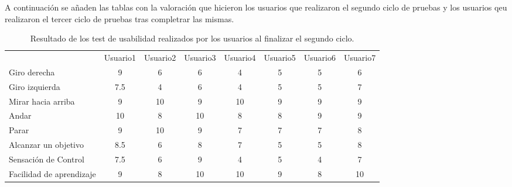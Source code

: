 \documentclass[twoside, 11pt]{epstfg}
\begin{document}
A continuación se añaden las tablas con la valoración que hicieron los usuarios que realizaron el segundo ciclo de pruebas y los usuarios qeu realizaron el tercer ciclo de pruebas tras completrar las mismas. 



\begin{center}
	\begin{table}[h]
		\small
		
		\begin{tabular}{|g  c  c  c  c  c  c  c |}
			\hline
			 \\ \hline
			& Usuario1 & Usuario2 & Usuario3 & Usuario4 & Usuario5 & Usuario6 & Usuario7\\
			
			Giro derecha & 9 & 6 & 6 & 4 & 5 & 5 & 6\\
			Giro izquierda & 7.5 & 4 & 6 & 4 & 5 & 5 & 7\\
			Mirar hacia arriba & 9 & 10 & 9 & 10 & 9 & 9 & 9\\
			Andar & 10 & 8 & 10 & 8 & 8 & 9 & 9\\
			Parar & 9 & 10 & 9 & 7 & 7 & 7 & 8\\
			Alcanzar un objetivo & 8.5 & 6 & 8 & 7 & 5 & 5 & 8\\
			Sensación de Control & 7.5 & 6 & 9 & 4 & 5 & 4 & 7\\
			Facilidad de aprendizaje & 9 & 8 & 10 & 10 & 9 & 8 & 10\\
			\hline
		\end{tabular}
		\caption{Resultado de los test de usabilidad realizados por los usuarios al finalizar el segundo ciclo.}
		\label{tabla2ciclo}
	\end{table}
\end{center}
\end{document}

